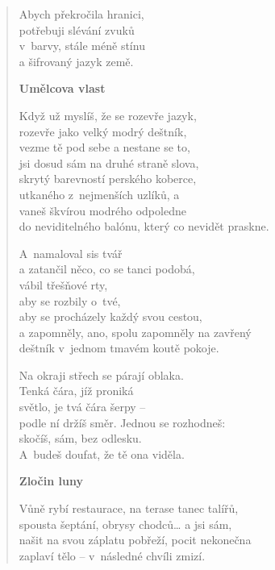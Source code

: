 \begin{verse}
\medskip

Abych překročila hranici, \\
potřebuji slévání zvuků \\
v~barvy, stále méně stínu \\
a šifrovaný jazyk země. \\

\bigskip

\textbf{Umělcova vlast}

\medskip

Když už myslíš, že se rozevře jazyk, \\
rozevře jako velký modrý deštník, \\
vezme tě pod sebe a nestane se to, \\
jsi dosud sám na druhé straně slova, \\
skrytý barevností perského koberce, \\ 
utkaného z nejmenších uzlíků, a \\
vaneš škvírou modrého odpoledne \\
do neviditelného balónu, který co nevidět praskne. \\

\medskip

A~namaloval sis tvář \\
a zatančil něco, co se tanci podobá, \\
vábil třešňové rty, \\
aby se rozbily o~tvé, \\
aby se procházely každý svou cestou, \\
a zapomněly, ano, spolu zapomněly na zavřený \\
deštník v jednom tmavém koutě pokoje. \\

\medskip

Na okraji střech se párají oblaka. \\
Tenká čára, jíž proniká  \\
světlo, je tvá čára šerpy --  \\
podle ní držíš směr. Jednou se rozhodneš: \\
skočíš, sám, bez odlesku. \\
A~budeš doufat, že tě ona viděla. \\

\medskip

\textbf{Zločin luny}

\medskip

Vůně rybí restaurace, na terase tanec talířů, \\
spousta šeptání, obrysy chodců… a jsi sám, \\
našit na svou záplatu pobřeží, pocit nekonečna \\
zaplaví tělo -- v následné chvíli zmizí. \\


\end{verse}
